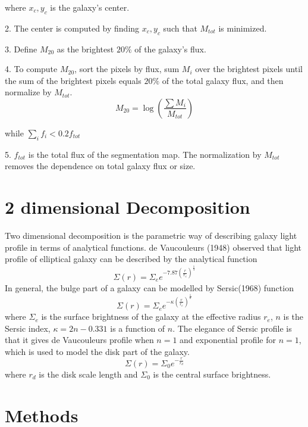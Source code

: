 \documentclass[a4paper,12pt]{article}
\begin{document}
where $x_c, y_c$ is the galaxy's center.

2. The center is computed by finding $x_c, y_c$ such that $M_{tot}$ is minimized.

3. Define $M_{20}$ as the brightest $20\%$ of the galaxy's flux.

4. To compute $M_{20}$, sort the pixels by flux, sum $M_i$ over the brightest pixels until the sum of the brightest pixels equals $20\%$  of the total galaxy flux, and then normalize by $M_{tot}$.
\begin{equation}
M_20 = \log\left( \frac{\sum M_i}{M_{tot}}\right)
\end{equation}

while $\sum_i f_i <0.2 f_{tot}$

5. $f_{tot}$ is the total flux of the segmentation map. The normalization by $M_{tot}$ removes the dependence  on total galaxy flux or size.
\section{2 dimensional Decomposition}
Two dimensional decomposition is the parametric way of describing galaxy light profile in terms of analytical functions. de Vaucouleurs (1948) observed that light profile of elliptical galaxy can be described by the analytical function
\begin{equation}
\Sigma(r) = \Sigma_e e^{-7.87 (\frac{r}{r_e})^{\frac{1}{4}}}
\end{equation}
In general, the bulge part of a galaxy can be modelled by Sersic(1968) function
\begin{equation}
 \Sigma(r) = \Sigma_e e^{-\kappa (\frac{r}{r_e})^{\frac{1}{n}}}
\end{equation}
where $\Sigma_e$ is the surface brightness of the galaxy at the effective radius $r_e$, $n$ is the Sersic index, $\kappa = 2n - 0.331$ is a function of $n$. The elegance of Sersic profile is that it gives de Vaucouleurs profile when $n = 1$  and exponential profile for $n = 1$, which is used to model the disk part of the galaxy.
\begin{equation}
\Sigma(r) = \Sigma_0 e^{-\frac{r}{r_d}}
\end{equation}
where $r_d$ is the disk scale length and $\Sigma_0$ is the central surface brightness.

\section{Methods}
\end{document}
